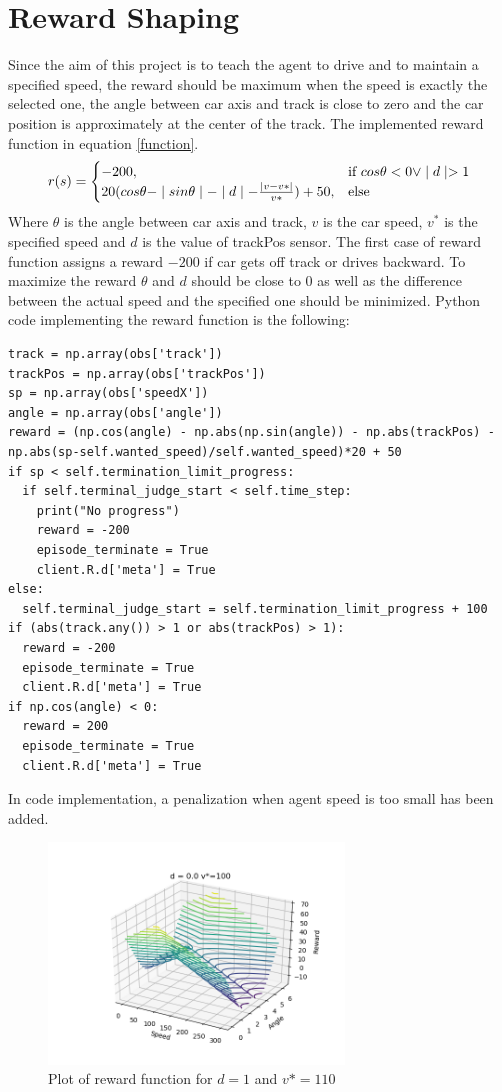 \documentclass[Lau,oneside,noexaminfo]{sapthesis} %
\begin{document}
\section{Reward Shaping}
Since the aim of this project is to teach the agent to drive and to maintain a specified speed, the reward should be maximum when the speed is exactly the selected one, the angle between car axis and track is close to zero and the car position is approximately at the center of the track.
The implemented reward function in equation \ref{function}.
\begin{equation}
r(s) = \begin{cases} -200, & \mbox{if } cos \theta < 0  \vee \mid d \mid > 1 \\ 20(cos\theta - \mid sin\theta \mid - \mid d \mid - {\mid v - v*\mid \over v*}) + 50, & \mbox{else} \end{cases}
\label{reward_function}
\end{equation}
Where $\theta$ is the angle between car axis and track, $v$ is the car speed, $v^*$ is the specified speed and $d$ is the value of trackPos sensor. The first case of reward function assigns a reward $-200$ if car gets off track or drives backward.
To maximize the reward $\theta$ and $d$ should be close to $0$ as well as the difference between the actual speed and the specified one should be minimized.
Python code implementing the reward function is the following:
\begin{lstlisting}
track = np.array(obs['track'])
trackPos = np.array(obs['trackPos'])
sp = np.array(obs['speedX'])
angle = np.array(obs['angle'])
reward = (np.cos(angle) - np.abs(np.sin(angle)) - np.abs(trackPos) - np.abs(sp-self.wanted_speed)/self.wanted_speed)*20 + 50
if sp < self.termination_limit_progress:
  if self.terminal_judge_start < self.time_step:
    print("No progress")
    reward = -200
    episode_terminate = True
    client.R.d['meta'] = True
else:
  self.terminal_judge_start = self.termination_limit_progress + 100
if (abs(track.any()) > 1 or abs(trackPos) > 1):
  reward = -200
  episode_terminate = True
  client.R.d['meta'] = True
if np.cos(angle) < 0:
  reward = 200
  episode_terminate = True
  client.R.d['meta'] = True
\end{lstlisting}
In code implementation, a penalization when agent speed is too small has been added.
\begin{figure}[H]
  \centering
  \includegraphics[width=0.7\textwidth]{reward_plot0}
  \caption{Plot of reward function for $d = 1$ and $v*=110$}
  \label{rewardshapingplot0}
\end{figure}
\end{document}
